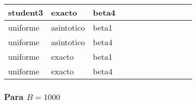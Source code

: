 \documentclass[]{article}
\begin{document}
\begin{table}[H]
\begin{tabular}{l|l|l|l|l|l|l|l|l|l|l|l}
\hline
student3 & exacto & beta4 & \cellcolor{gray}{\textcolor{red}{0}} & \cellcolor{white}{\textcolor{blue}{1}} & \cellcolor{white}{\textcolor{blue}{1}} & \cellcolor{gray}{\textcolor{red}{0}} & \cellcolor{white}{\textcolor{blue}{1}} & \cellcolor{white}{\textcolor{blue}{1}} & \cellcolor{white}{\textcolor{blue}{1}} & \cellcolor{white}{\textcolor{blue}{1}} & \cellcolor{white}{\textcolor{blue}{1}}\\
\hline
\rowcolor{gray!6}  uniforme & asintotico & beta1 & \cellcolor{white}{\textcolor{blue}{1}} & \cellcolor{white}{\textcolor{blue}{1}} & \cellcolor{white}{\textcolor{blue}{1}} & \cellcolor{white}{\textcolor{blue}{1}} & \cellcolor{white}{\textcolor{blue}{1}} & \cellcolor{white}{\textcolor{blue}{1}} & \cellcolor{white}{\textcolor{blue}{1}} & \cellcolor{white}{\textcolor{blue}{1}} & \cellcolor{white}{\textcolor{blue}{1}}\\
\hline
uniforme & asintotico & beta4 & \cellcolor{white}{\textcolor{blue}{1}} & \cellcolor{white}{\textcolor{blue}{1}} & \cellcolor{white}{\textcolor{blue}{1}} & \cellcolor{white}{\textcolor{blue}{1}} & \cellcolor{white}{\textcolor{blue}{1}} & \cellcolor{white}{\textcolor{blue}{1}} & \cellcolor{white}{\textcolor{blue}{1}} & \cellcolor{white}{\textcolor{blue}{1}} & \cellcolor{white}{\textcolor{blue}{1}}\\
\hline
\rowcolor{gray!6}  uniforme & exacto & beta1 & \cellcolor{white}{\textcolor{blue}{1}} & \cellcolor{white}{\textcolor{blue}{1}} & \cellcolor{white}{\textcolor{blue}{1}} & \cellcolor{white}{\textcolor{blue}{1}} & \cellcolor{white}{\textcolor{blue}{1}} & \cellcolor{white}{\textcolor{blue}{1}} & \cellcolor{white}{\textcolor{blue}{1}} & \cellcolor{white}{\textcolor{blue}{1}} & \cellcolor{white}{\textcolor{blue}{1}}\\
\hline
uniforme & exacto & beta4 & \cellcolor{white}{\textcolor{blue}{1}} & \cellcolor{white}{\textcolor{blue}{1}} & \cellcolor{white}{\textcolor{blue}{1}} & \cellcolor{white}{\textcolor{blue}{1}} & \cellcolor{white}{\textcolor{blue}{1}} & \cellcolor{white}{\textcolor{blue}{1}} & \cellcolor{white}{\textcolor{blue}{1}} & \cellcolor{white}{\textcolor{blue}{1}} & \cellcolor{white}{\textcolor{blue}{1}}\\
\hline
\end{tabular}
\end{table}

\hypertarget{para-b1000}{%
\subsubsection{\texorpdfstring{Para
\(B=1000\)}{Para B=1000}}\label{para-b1000}}
\end{document}
